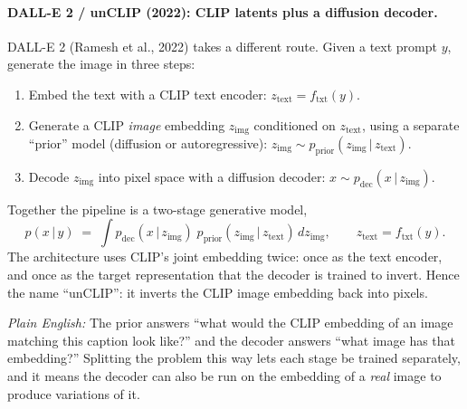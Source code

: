 \documentclass[11pt]{article}
\newcommand{\given}{\,\vert\,}
\theoremstyle{remark}
\newcommand{\ftxt}{f_{\text{txt}}}
\newcommand{\plain}[1]{\medskip\noindent\textit{Plain English:} #1\medskip}
\begin{document}
\paragraph{DALL-E 2 / unCLIP (2022): CLIP latents plus a diffusion decoder.}
DALL-E 2 (Ramesh et al., 2022) takes a different route. Given a text prompt $y$, generate the image in three steps:
\begin{enumerate}[leftmargin=1.6em]
  \item Embed the text with a CLIP text encoder: $z_{\text{text}} = \ftxt(y)$.
  \item Generate a CLIP \emph{image} embedding $z_{\text{img}}$ conditioned on $z_{\text{text}}$, using a separate ``prior'' model (diffusion or autoregressive): $z_{\text{img}} \sim p_{\text{prior}}(z_{\text{img}} \given z_{\text{text}})$.
  \item Decode $z_{\text{img}}$ into pixel space with a diffusion decoder: $x \sim p_{\text{dec}}(x \given z_{\text{img}})$.
\end{enumerate}
Together the pipeline is a two-stage generative model,
\begin{equation}
p(x \given y) \;=\; \int p_{\text{dec}}(x \given z_{\text{img}})\; p_{\text{prior}}(z_{\text{img}} \given z_{\text{text}})\, dz_{\text{img}},
\qquad z_{\text{text}} = \ftxt(y).
\label{eq:unclip}
\end{equation}
The architecture uses CLIP's joint embedding twice: once as the text encoder, and once as the target representation that the decoder is trained to invert. Hence the name ``unCLIP'': it inverts the CLIP image embedding back into pixels.

\plain{The prior answers ``what would the CLIP embedding of an image matching this caption look like?'' and the decoder answers ``what image has that embedding?'' Splitting the problem this way lets each stage be trained separately, and it means the decoder can also be run on the embedding of a \emph{real} image to produce variations of it.}
\end{document}
